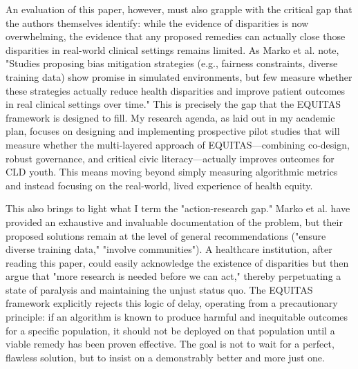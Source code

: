 \documentclass[11pt,twoside]{article}
\begin{document}
An evaluation of this paper, however, must also grapple with the critical gap that the authors themselves identify: while the evidence of disparities is now overwhelming, the evidence that any proposed remedies can actually close those disparities in real-world clinical settings remains limited. As Marko et al. note, "Studies proposing bias mitigation strategies (e.g., fairness constraints, diverse training data) show promise in simulated environments, but few measure whether these strategies actually reduce health disparities and improve patient outcomes in real clinical settings over time." This is precisely the gap that the EQUITAS framework is designed to fill. My research agenda, as laid out in my academic plan, focuses on designing and implementing prospective pilot studies that will measure whether the multi-layered approach of EQUITAS—combining co-design, robust governance, and critical civic literacy—actually improves outcomes for CLD youth. This means moving beyond simply measuring algorithmic metrics and instead focusing on the real-world, lived experience of health equity.

This also brings to light what I term the "action-research gap." Marko et al. have provided an exhaustive and invaluable documentation of the problem, but their proposed solutions remain at the level of general recommendations ("ensure diverse training data," "involve communities"). A healthcare institution, after reading this paper, could easily acknowledge the existence of disparities but then argue that "more research is needed before we can act," thereby perpetuating a state of paralysis and maintaining the unjust status quo. The EQUITAS framework explicitly rejects this logic of delay, operating from a precautionary principle: if an algorithm is known to produce harmful and inequitable outcomes for a specific population, it should not be deployed on that population until a viable remedy has been proven effective. The goal is not to wait for a perfect, flawless solution, but to insist on a demonstrably better and more just one.
\end{document}
